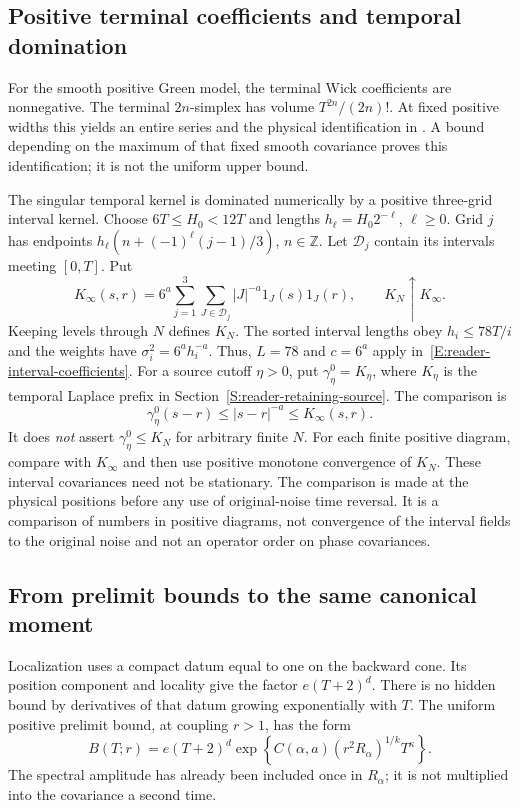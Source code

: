 \subsection{Positive terminal coefficients and temporal domination}

For the smooth positive Green model, the terminal Wick coefficients are
nonnegative. The terminal $2n$-simplex has volume $T^{2n}/(2n)!$. At fixed
positive widths this yields an entire series and the physical identification in
. A bound depending on the maximum of that fixed
smooth covariance proves this identification; it is not the uniform upper bound.

The singular temporal kernel is dominated numerically by a positive three-grid
interval kernel. Choose $6T \le H_0 < 12T$ and lengths $h_\ell = H_0 2^{-\ell}$,
$\ell \ge 0$. Grid $j$ has endpoints $h_\ell(n+(-1)^\ell(j-1)/3)$, $n \in
\mathbb{Z}$. Let $\mathcal{D}_j$ contain its intervals meeting $[0,T]$. Put
\begin{equation}\label{E:reader-K}
  K_\infty(s,r)=6^a\sum_{j=1}^3\sum_{J\in\mathcal{D}_j}
  |J|^{-a}1_J(s)1_J(r),\qquad K_N\uparrow K_\infty.
\end{equation}
Keeping levels through $N$ defines $K_N$. The sorted interval lengths obey $h_i
\le 78T/i$ and the weights have $\sigma_i^2 = 6^ah_i^{-a}$. Thus, $L = 78$ and
$c = 6^a$ apply in~\eqref{E:reader-interval-coefficients}. For a source cutoff
$\eta > 0$, put $\gamma_\eta^0 = K_\eta$, where $K_\eta$ is the temporal Laplace
prefix in Section~\ref{S:reader-retaining-source}. The comparison is
\[
  \gamma_\eta^0(s-r)\le |s-r|^{-a}\le K_\infty(s,r).
\]
It does \emph{not} assert $\gamma_\eta^0 \le K_N$ for arbitrary finite $N$. For
each finite positive diagram, compare with $K_\infty$ and then use positive
monotone convergence of $K_N$. These interval covariances need not be
stationary. The comparison is made at the physical positions before any use of
original-noise time reversal. It is a comparison of numbers in positive
diagrams, not convergence of the interval fields to the original noise and not
an operator order on phase covariances.

\subsection{From prelimit bounds to the same canonical moment}

Localization uses a compact datum equal to one on the backward cone. Its
position component and locality give the factor $e(T+2)^d$. There is no hidden
bound by derivatives of that datum growing exponentially with $T$. The uniform
positive prelimit bound, at coupling $r > 1$, has the form
\begin{equation}\label{E:reader-Br}
  B(T;r)=e(T+2)^d\exp\left\{
  C(\alpha,a)(r^2R_\alpha)^{1/k}T^\kappa\right\}.
\end{equation}
The spectral amplitude has already been included once in $R_\alpha$; it is not
multiplied into the covariance a second time.


